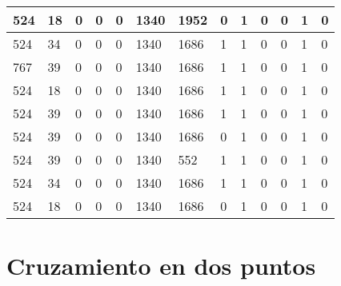 \begin{table}[H]
\begin{tabular}{|l|l|l|l|l|l|l|l|l|l|l|l|l|}
524  &  18  &  0  &  0  &  0  &  1340  &  1952  &  0  &  1  &  0  &  0  &  1  &  0 \\ \hline
524  &  34  &  0  &  0  &  0  &  1340  &  1686  &  1  &  1  &  0  &  0  &  1  &  0 \\ \hline
767  &  39  &  0  &  0  &  0  &  1340  &  1686  &  1  &  1  &  0  &  0  &  1  &  0 \\ \hline
524  &  18  &  0  &  0  &  0  &  1340  &  1686  &  1  &  1  &  0  &  0  &  1  &  0 \\ \hline
524  &  39  &  0  &  0  &  0  &  1340  &  1686  &  1  &  1  &  0  &  0  &  1  &  0 \\ \hline
524  &  39  &  0  &  0  &  0  &  1340  &  1686  &  0  &  1  &  0  &  0  &  1  &  0 \\ \hline
524  &  39  &  0  &  0  &  0  &  1340  &  552  &  1  &  1  &  0  &  0  &  1  &  0 \\ \hline
524  &  34  &  0  &  0  &  0  &  1340  &  1686  &  1  &  1  &  0  &  0  &  1  &  0 \\ \hline
524  &  18  &  0  &  0  &  0  &  1340  &  1686  &  0  &  1  &  0  &  0  &  1  &  0 \\ \hline
\end{tabular}
\end{table}

\section{Cruzamiento en dos puntos}

